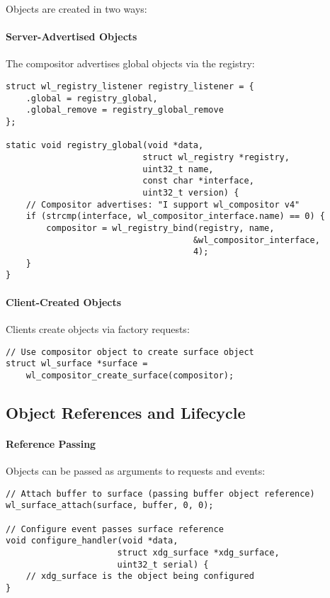 Objects are created in two ways:

\paragraph{Server-Advertised Objects}
The compositor advertises global objects via the registry:

\begin{lstlisting}[style=cstyle, caption=Registry Events]
struct wl_registry_listener registry_listener = {
    .global = registry_global,
    .global_remove = registry_global_remove
};

static void registry_global(void *data,
                           struct wl_registry *registry,
                           uint32_t name,
                           const char *interface,
                           uint32_t version) {
    // Compositor advertises: "I support wl_compositor v4"
    if (strcmp(interface, wl_compositor_interface.name) == 0) {
        compositor = wl_registry_bind(registry, name,
                                     &wl_compositor_interface,
                                     4);
    }
}
\end{lstlisting}

\paragraph{Client-Created Objects}
Clients create objects via factory requests:

\begin{lstlisting}[style=cstyle, caption=Creating a Surface]
// Use compositor object to create surface object
struct wl_surface *surface =
    wl_compositor_create_surface(compositor);
\end{lstlisting}

\subsection{Object References and Lifecycle}

\paragraph{Reference Passing}
Objects can be passed as arguments to requests and events:

\begin{lstlisting}[style=cstyle, caption=Object References]
// Attach buffer to surface (passing buffer object reference)
wl_surface_attach(surface, buffer, 0, 0);

// Configure event passes surface reference
void configure_handler(void *data,
                      struct xdg_surface *xdg_surface,
                      uint32_t serial) {
    // xdg_surface is the object being configured
}
\end{lstlisting}

